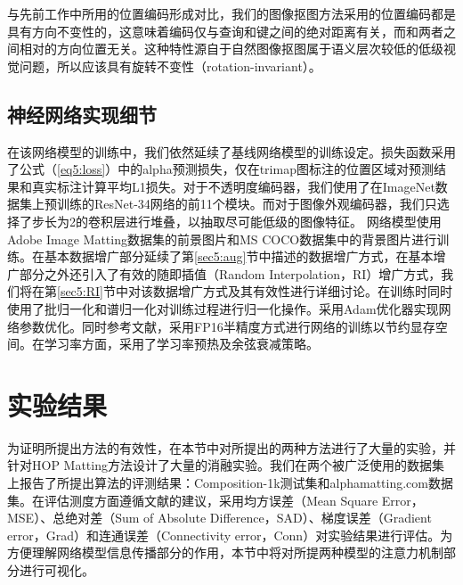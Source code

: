 与先前工作中所用的位置编码\cite{vaswani2017attention,dai2019transformer,ramachandran2019stand}形成对比，我们的图像抠图方法采用的位置编码都是具有方向不变性的，这意味着编码仅与查询和键之间的绝对距离有关，而和两者之间相对的方向位置无关。这种特性源自于自然图像抠图属于语义层次较低的低级视觉问题，所以应该具有旋转不变性（rotation-invariant）。

\subsection{神经网络实现细节}

在该网络模型的训练中，我们依然延续了基线网络模型的训练设定。损失函数采用了公式（\ref{eq5:loss}）中的alpha预测损失，仅在trimap图标注的位置区域对预测结果和真实标注计算平均L1损失。对于不透明度编码器，我们使用了在ImageNet数据集\cite{russakovsky2015imagenet}上预训练的ResNet-34网络\cite{he2016deep}的前11个模块。而对于图像外观编码器，我们只选择了步长为2的卷积层进行堆叠，以抽取尽可能低级的图像特征。
网络模型使用Adobe Image Matting数据集\cite{xu2017deep}的前景图片和MS COCO数据集中的背景图片进行训练\cite{lin2014microsoft}。在基本数据增广部分延续了第\ref{sec5:aug}节中描述的数据增广方式，在基本增广部分之外还引入了有效的随即插值（Random Interpolation，RI）增广方式，我们将在第\ref{sec5:RI}节中对该数据增广方式及其有效性进行详细讨论。在训练时同时使用了批归一化\cite{ioffe2015batch}和谱归一化\cite{miyato2018spectral}对训练过程进行归一化操作。采用Adam优化器\cite{kingma2014adam}实现网络参数优化。同时参考文献\parencite{he2019bag}，采用FP16半精度方式进行网络的训练以节约显存空间。在学习率方面，采用了学习率预热\cite{goyal2017accurate}及余弦衰减\cite{loshchilov2016sgdr}策略。




\section{实验结果}
为证明所提出方法的有效性，在本节中对所提出的两种方法进行了大量的实验，并针对HOP Matting方法设计了大量的消融实验。我们在两个被广泛使用的数据集上报告了所提出算法的评测结果：Composition-1k测试集\cite{xu2017deep}和alphamatting.com数据集\cite{rhemann2009perceptually}。在评估测度方面遵循文献\parencite{rhemann2009perceptually}的建议，采用均方误差（Mean Square Error，MSE）、总绝对差（Sum of Absolute Difference，SAD）、梯度误差（Gradient error，Grad）和连通误差（Connectivity error，Conn）对实验结果进行评估。为方便理解网络模型信息传播部分的作用，本节中将对所提两种模型的注意力机制部分进行可视化。


